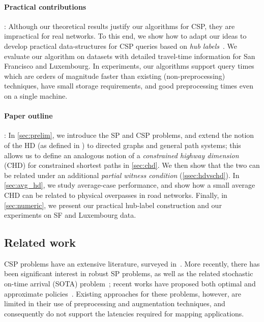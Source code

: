 \paragraph{Practical contributions}: 
Although our theoretical results justify our algorithms for CSP, they are impractical for real networks. 
To this end, we show how to adapt our ideas to develop practical data-structures for CSP queries based on {\em hub labels}~\cite{cohen_definition_hl}. 
We evaluate our algorithm on datasets with detailed travel-time information for San Francisco and Luxembourg.
In experiments, our algorithms support query times which are orders of magnitude faster than existing (non-preprocessing) techniques, have small storage requirements, and good preprocessing times even on a single machine. 

\paragraph{Paper outline}:
In \cref{sec:prelim}, we introduce the SP and CSP problems, and extend the notion of the HD (as defined in \cite{highway2013}) to directed graphs and general path systems; this allows us to define an analogous notion of a \emph{constrained highway dimension} (CHD) for constrained shortest paths in \cref{sec:chd}. 
We then show that the two can be related under an additional \emph{partial witness condition} (\cref{ssec:hdvschd}). 
In \cref{sec:avg_hd}, we study average-case performance, and show how a small average CHD can be related to physical overpasses in road networks. 
Finally, in \cref{sec:numeric}, we present our practical hub-label construction and our experiments on SF and Luxembourg data.


\subsection{Related work}

CSP problems have an extensive literature, surveyed in~\cite{csp_survey}. 
More recently, there has been significant interest in robust SP problems, as well as the related stochastic on-time arrival (SOTA) problem~\cite{fan2005arriving}; recent works have proposed both optimal and approximate policies~\cite{sabran2014precomputation,nikolova_discretization}. 
Existing approaches for these problems, however, are limited in their use of preprocessing and augmentation techniques, and consequently do not support the latencies required for mapping applications.

